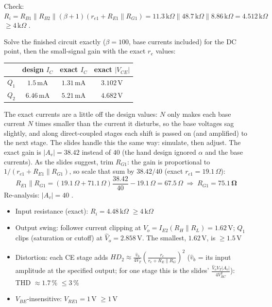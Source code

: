 \documentclass[11pt]{article}
\newcommand{\solstep}[2]{\par\medskip{\color{stepc}\textbf{Step #1 --- #2}}\par\nopagebreak}
\begin{document}
Check: $R_i = R_{B1}\|R_{B2}\|(\beta+1)(r_{e1} + R_{E1}\|R_{G1}) = 11.3\,\mathrm{k}\Omega\|48.7\,\mathrm{k}\Omega\|8.86\,\mathrm{k}\Omega = 4.512\,\mathrm{k}\Omega$ $\ge 4\,\mathrm{k}\Omega$ \checkmark.
\solstep{4}{Check by analysis}Solve the finished circuit exactly ($\beta=100$, base currents included) for the DC point, then the small-signal gain with the exact $r_e$ values:\begin{center}\renewcommand{\arraystretch}{1.35}
\begin{tabular}{cccc}
\toprule
 & design $I_C$ & exact $I_C$ & exact $|V_{CE}|$ \\
\midrule
$Q_{1}$ & $1.5\,\mathrm{m}\mathrm{A}$ & $1.31\,\mathrm{m}\mathrm{A}$ & $3.102\,\mathrm{V}$ \\
$Q_{2}$ & $6.46\,\mathrm{m}\mathrm{A}$ & $5.21\,\mathrm{m}\mathrm{A}$ & $4.682\,\mathrm{V}$ \\
\bottomrule
\end{tabular}\end{center}
The exact currents are a little off the design values: $N$ only makes each base current $N$ times smaller than the current it disturbs, so the base voltages sag slightly, and along direct-coupled stages each shift is passed on (and amplified) to the next stage. The slides handle this the same way: simulate, then adjust. The exact gain is $|A_v| = 38.42$ instead of $40$ (the hand design ignored $\alpha$ and the base currents). As the slides suggest, trim $R_{G1}$: the gain is proportional to $1/(r_{e1} + R_{E1}\|R_{G1})$, so scale that sum by $38.42/40$ (exact $r_{e1} = 19.1\,\Omega$):\[R_{E1}\|R_{G1} = (19.1\,\Omega + 71.1\,\Omega)\frac{38.42}{40} - 19.1\,\Omega = 67.5\,\Omega \;\Rightarrow\; R_{G1} = \mathbf{75.1\,\Omega}\]Re-analysis: $|A_v| = 40$ \checkmark. \begin{itemize}[leftmargin=*,itemsep=2pt]
\item Input resistance (exact): $R_i = 4.48\,\mathrm{k}\Omega$ $\ge 4\,\mathrm{k}\Omega$ \checkmark
\item Output swing: follower current clipping at $\hat V_o = I_{E2}(R_H\|R_L) = 1.62\,\mathrm{V}$; $Q_{1}$ clips (saturation or cutoff) at $\hat V_o = 2.858\,\mathrm{V}$. The smallest, $1.62\,\mathrm{V}$, is $\ge 1.5$\,V \checkmark
\item Distortion: each CE stage adds $HD_2 \approx \frac{\hat v_b}{4V_T}\left(\frac{r_e}{r_e + R_E\|R_G}\right)^2$ ($\hat v_b$ = its input amplitude at the specified output; for one stage this is the slides' $\frac{\hat V_o V_T |A_v|}{4V_{RC}^2}$): THD $\approx 1.7\,\%$ $\le 3\,\%$ \checkmark
\item $V_{BE}$-insensitive: $V_{RE1} = 1$\,V $\ge 1$\,V \checkmark
\end{itemize}
\end{document}
